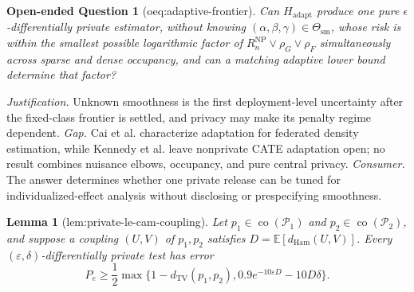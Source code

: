 \documentclass{article}
\newtheorem{lemma}{Lemma}
\newtheorem{openendedquestion}{Open-ended Question}
\begin{document}
\begin{openendedquestion}[oeq:adaptive-frontier]\label{oeq:adaptive-frontier}
Can \(H_{\mathrm{adapt}}\) produce one pure \(\epsilon\)-differentially private estimator, without knowing \((\alpha,\beta,\gamma)\in\Theta_{\mathrm{sm}}\), whose risk is within the smallest possible logarithmic factor of \(R_n^{\mathrm{NP}}\vee\rho_G\vee\rho_F\) simultaneously across sparse and dense occupancy, and can a matching adaptive lower bound determine that factor?
\end{openendedquestion}
\par\smallskip\noindent \textit{Justification.} Unknown smoothness is the first deployment-level uncertainty after the fixed-class frontier is settled, and privacy may make its penalty regime dependent. \textit{Gap.} Cai et al. characterize adaptation for federated density estimation, while Kennedy et al. leave nonprivate CATE adaptation open; no result combines nuisance elbows, occupancy, and pure central privacy. \textit{Consumer.} The answer determines whether one private release can be tuned for individualized-effect analysis without disclosing or prespecifying smoothness.

\begin{lemma}[lem:private-le-cam-coupling]\label{lem:private-le-cam-coupling}
Let \(p_1\in\operatorname{co}(\mathcal P_1)\) and
\(p_2\in\operatorname{co}(\mathcal P_2)\), and suppose a coupling
\((U,V)\) of \(p_1,p_2\) satisfies
\(D=\mathbb E[d_{\mathrm{Ham}}(U,V)]\).  Every
\((\varepsilon,\delta)\)-differentially private test has error
\[
 P_e\ge\frac12\max\{1-d_{\mathrm{TV}}(p_1,p_2),
 0.9e^{-10\varepsilon D}-10D\delta\}.
\]
\end{lemma}
\end{document}
